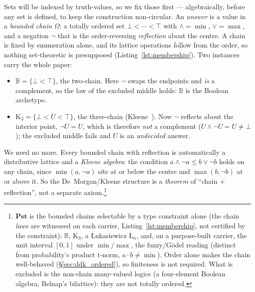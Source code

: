 \documentclass[11pt, a4paper]{article}
\begin{document}
Sets will be indexed by truth-values, so we fix those first --- algebraically, before any set is defined, to keep the construction non-circular.
An \emph{answer} is a value in a \emph{bounded chain} $\Omega$: a totally ordered set $\bot < \cdots < \top$ with $\wedge = \min$, $\vee = \max$, and a negation $\neg$ that is the order-reversing \emph{reflection} about the centre.
A chain is fixed by enumeration alone, and its lattice operations follow from the order, so nothing set-theoretic is presupposed (Listing~\ref{lst:membership}).
Two instances carry the whole paper:
\begin{itemize}
\item $\mathbb{B} = \{\bot < \top\}$, the two-chain.  Here $\neg$ swaps the endpoints and \emph{is} a complement, so the law of the excluded middle holds: $\mathbb{B}$ is the Boolean archetype.
\item $\mathrm{K}_3 = \{\bot < U < \top\}$, the three-chain (Kleene~\cite{kleene1952metamathematics}).  Now $\neg$ reflects about the interior point, $\neg U = U$, which is therefore \emph{not} a complement ($U \wedge \neg U = U \neq \bot$); the excluded middle fails and $U$ is an \emph{undecided} answer.
\end{itemize}
We need no more.
Every bounded chain with reflection is automatically a distributive lattice and a \emph{Kleene algebra}: the condition $a \wedge \neg a \le b \vee \neg b$ holds on any chain, since $\min(a, \neg a)$ sits at or below the centre and $\max(b, \neg b)$ at or above it.
So the De~Morgan/Kleene structure is a \emph{theorem} of ``chain $+$ reflection'', not a separate axiom.\footnote{$\mathbf{Pst}$ is the bounded chains selectable by a type constraint alone (the chain \emph{laws} are witnessed on each carrier, Listing~\ref{lst:membership}, not certified by the constraint): $\mathbb{B}$, $\mathrm{K}_3$, a {\L}ukasiewicz $\text{\L}_n$, and, on a purpose-built carrier, the unit interval $[0,1]$ under $\min/\max$, the fuzzy/G\"odel reading (distinct from probability's product t-norm, $a \cdot b \ne \min$).  Order alone makes the chain well-behaved (§\ref{sec:ddk_ordered}), so finiteness is not required.  What is excluded is the non-chain many-valued logics (a four-element Boolean algebra, Belnap's bilattice): they are not totally ordered.}
\end{document}

